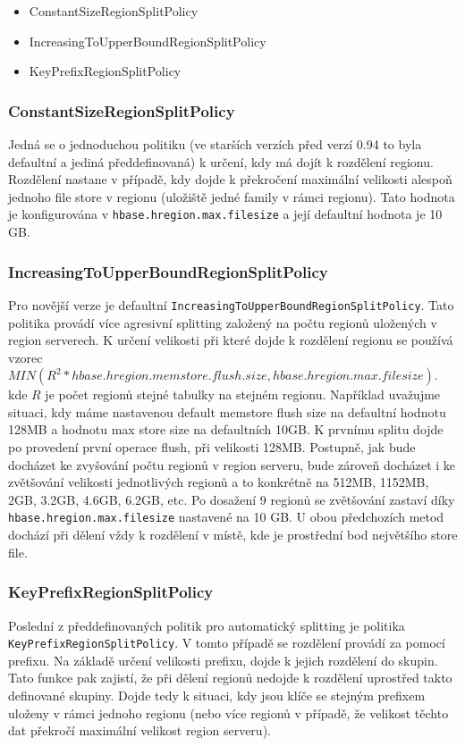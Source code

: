 \documentclass[thesis=M,czech]{FITthesis}[2012/06/26]
\begin{document}
\begin{itemize}
	\item ConstantSizeRegionSplitPolicy
	\item IncreasingToUpperBoundRegionSplitPolicy
	\item KeyPrefixRegionSplitPolicy
\end{itemize} 

\subsubsection{ConstantSizeRegionSplitPolicy}
Jedná se o jednoduchou politiku (ve starších verzích před verzí 0.94 to byla defaultní a jediná předdefinovaná) k určení, kdy má dojít k rozdělení regionu. Rozdělení nastane v případě, kdy dojde k překročení maximální velikosti alespoň jednoho file store v regionu (uložiště jedné family v rámci regionu). Tato hodnota je konfigurována v \texttt{hbase.hregion.max.filesize} a její defaultní hodnota je 10 GB. 

\subsubsection{IncreasingToUpperBoundRegionSplitPolicy}
Pro novější verze je defaultní \texttt{IncreasingToUpperBoundRegionSplitPolicy}. Tato politika provádí více agresivní splitting  založený na počtu regionů uložených v region serverech. K určení velikosti při které dojde k rozdělení regionu se používá vzorec \\  $MIN(R^2 * hbase.hregion.memstore.flush.size,hbase.hregion.max.filesize)$. \\ kde $R$ je počet regionů stejné tabulky na stejném regionu. Například uvažujme situaci, kdy máme nastavenou default memstore flush size na defaultní hodnotu 128MB a hodnotu max store size na defaultních 10GB. K prvnímu splitu dojde po provedení první operace flush, při velikosti 128MB. Postupně, jak bude docházet ke zvyšování počtu regionů v region serveru, bude zároveň docházet i ke zvětšování velikosti jednotlivých regionů a to konkrétně na 512MB, 1152MB, 2GB, 3.2GB, 4.6GB, 6.2GB, etc. Po dosažení 9 regionů se zvětšování zastaví díky \texttt{hbase.hregion.max.filesize} nastavené na 10 GB. U obou předchozích metod dochází při dělení vždy k rozdělení v místě, kde je prostřední bod největšího store file.


\subsubsection{KeyPrefixRegionSplitPolicy}
Poslední z předdefinovaných politik pro automatický splitting je politika \\ \texttt{KeyPrefixRegionSplitPolicy}. V tomto případě se rozdělení provádí za pomocí prefixu. Na základě určení velikosti prefixu, dojde k jejich rozdělení do skupin. Tato funkce pak zajistí, že při dělení regionů nedojde k rozdělení uprostřed takto definované skupiny. Dojde tedy k situaci, kdy jsou klíče se stejným prefixem uloženy v rámci jednoho regionu (nebo více regionů v případě, že velikost těchto dat překročí maximální velikost region serveru).
\end{document}
